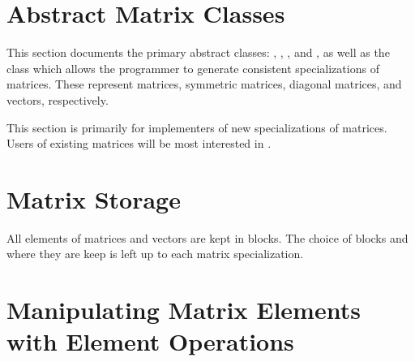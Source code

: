 





\section{Abstract Matrix Classes}

This section documents the primary abstract classes: ,
, , and ,
as well as the  class which allows the programmer to
generate consistent specializations of matrices.  These represent matrices,
symmetric matrices, diagonal matrices, and vectors, respectively.

This section is primarily for implementers of new specializations
of matrices.  Users of existing matrices will be most interested
in .







\section{Matrix Storage}

All elements of matrices and vectors are kept in blocks.  The
choice of blocks and where they are keep is left up to each
matrix specialization.











\section{Manipulating Matrix Elements with Element Operations}






